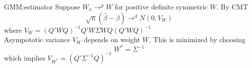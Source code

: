 \documentclass{beamer}
\begin{document}
\begin{frame}{GMM:estimator}
	Suppose $W_n \rightarrow^p W$ for positive definite symmetric $W$. By CMT
	\[\sqrt{n} (\hat{\beta} - \beta) \rightarrow^d N(0,V_W)\]
	where $V_W = (Q'WQ)^{-1} Q'W\Sigma WQ(Q'WQ)^{-1}$ \\
	Asympototic variance $V_W$ depends on weight $W$. This is minimized by choosing
	\[W^* = \Sigma^{-1}\]
	which implies $V_{W^*} = (Q'\Sigma^{-1}Q)^{-1}$ 
\end{frame}
\end{document}
